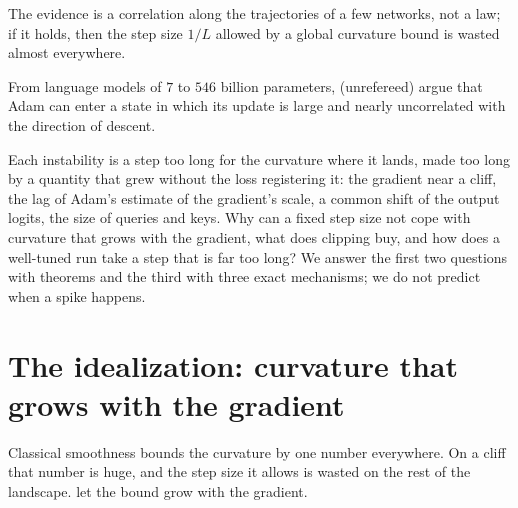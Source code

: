 \begin{refsection}
The evidence is a correlation along the trajectories of a few networks, not a law; if it holds, then the step size $1/L$ allowed by a global curvature bound is wasted almost everywhere.



From language models of $7$ to $546$ billion parameters, \textcite{MolybogEtAl2023} (unrefereed) argue that Adam can enter a state in which its update is large and nearly uncorrelated with the direction of descent.

Each instability is a step too long for the curvature where it lands, made too long by a quantity that grew without the loss registering it: the gradient near a cliff, the lag of Adam's estimate of the gradient's scale, a common shift of the output logits, the size of queries and keys. Why can a fixed step size not cope with curvature that grows with the gradient, what does clipping buy, and how does a well-tuned run take a step that is far too long? We answer the first two questions with theorems and the third with three exact mechanisms; we do not predict when a spike happens.

\section{The idealization: curvature that grows with the gradient}\label{sec:spikes:ideal}

Classical smoothness bounds the curvature by one number everywhere. On a cliff that number is huge, and the step size it allows is wasted on the rest of the landscape. \Textcite{ZhangHeSraJadbabaie2020} let the bound grow with the gradient.


\end{refsection}
